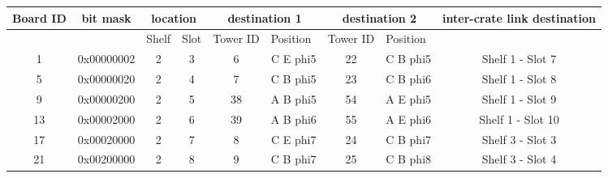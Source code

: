 \documentclass[11pt,letterpaper]{article}
\begin{document}
\begin{table}[h]
\centering
\tiny
\begin{tabular}{|c|c|c|c|c|c|c|c|c|}
\hline
Board ID               & bit mask              & \multicolumn{2}{c|}{location}                          & \multicolumn{2}{c|}{destination 1}                            & \multicolumn{2}{c|}{destination 2}                            & inter-crate link destination \\ \hline
\multicolumn{1}{|l|}{} & \multicolumn{1}{l|}{} & \multicolumn{1}{l|}{Shelf} & \multicolumn{1}{l|}{Slot} & \multicolumn{1}{l|}{Tower ID} & \multicolumn{1}{l|}{Position} & \multicolumn{1}{l|}{Tower ID} & \multicolumn{1}{l|}{Position} &                              \\ \hline
1                      & 0x00000002            & 2                          & 3                         & 6                             & C E phi5                      & 22                            & C B phi5                      & Shelf 1 - Slot 7             \\ \hline
5                      & 0x00000020            & 2                          & 4                         & 7                             & C B phi5                      & 23                            & C B phi6                      & Shelf 1 - Slot 8             \\ \hline
9                      & 0x00000200            & 2                          & 5                         & 38                            & A B phi5                      & 54                            & A E phi5                      & Shelf 1 - Slot 9             \\ \hline
13                     & 0x00002000            & 2                          & 6                         & 39                            & A B phi6                      & 55                            & A E phi6                      & Shelf 1 - Slot 10            \\ \hline
17                     & 0x00020000            & 2                          & 7                         & 8                             & C E phi7                      & 24                            & C B phi7                      & Shelf 3 - Slot 3             \\ \hline
21                     & 0x00200000            & 2                          & 8                         & 9                             & C B phi7                      & 25                            & C B phi8                      & Shelf 3 - Slot 4             \\ \hline

\end{tabular}
\end{table}
\end{document}
